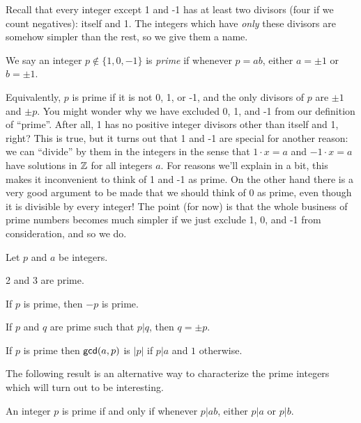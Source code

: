 Recall that every integer except 1 and -1 has at least two divisors (four if we count negatives): itself and 1.
The integers which have \emph{only} these divisors are somehow simpler than the rest, so we give them a name.

\begin{dfn}[Prime] \label{dfn:zz-prime}
We say an integer \(p \notin \{1,0,-1\}\) is \emph{prime} if whenever \(p = ab\), either \(a = \pm 1\) or \(b = \pm 1\).
\end{dfn}

Equivalently, \(p\) is prime if it is not 0, 1, or -1, and the only divisors of \(p\) are \(\pm 1\) and \(\pm p\).
You might wonder why we have excluded 0, 1, and -1 from our definition of ``prime''.
After all, 1 has no positive integer divisors other than itself and 1, right?
This is true, but it turns out that 1 and -1 are special for another reason: we can ``divide'' by them in the integers in the sense that \(1 \cdot x = a\) and \(-1 \cdot x = a\) have solutions in \(\mathbb{Z}\) for all integers \(a\).
For reasons we'll explain in a bit, this makes it inconvenient to think of 1 and -1 as prime.
On the other hand there is a very good argument to be made that we should think of 0 as prime, even though it is divisible by every integer!
The point (for now) is that the whole business of prime numbers becomes much simpler if we just exclude 1, 0, and -1 from consideration, and so we do.

\begin{prop}\label{prop:zz-prime}
Let \(p\) and \(a\) be integers.
\begin{proplist}
\item 2 and 3 are prime.
\item If \(p\) is prime, then \(-p\) is prime.
\item If \(p\) and \(q\) are prime such that \(p|q\), then \(q = \pm p\).
\item \label{prop:zz-prime:gcd} If \(p\) is prime then \(\mathsf{gcd}(a, p)\) is \(|p|\) if \(p|a\) and \(1\) otherwise.
\end{proplist}
\end{prop}

The following result is an alternative way to characterize the prime integers which will turn out to be interesting.

\begin{prop} \label{prop:zz-prime-2}
An integer \(p\) is prime if and only if whenever \(p|ab\), either \(p|a\) or \(p|b\).
\end{prop}

